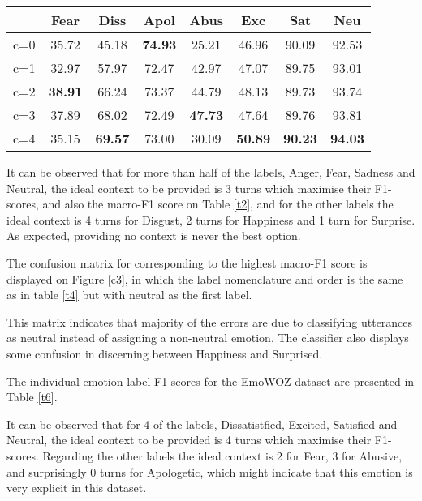 \documentclass[11pt]{article}
\begin{document}
\begin{table*}[t]
 \centering
 \caption{Model performance on each individual emotion label on the \textbf{EmoWOZ} dataset with the introduction of  conversational turns}
  \begin{tabular}{cccccccc}
    \hline
     & \textbf{Fear} & \textbf{Diss} & \textbf{Apol} & \textbf{Abus} & \textbf{Exc} & \textbf{Sat} & \textbf{Neu}  \\
    \hline
    c=0 &35.72           &45.18 & \textbf{74.93}& 25.21& 46.96& 90.09& 92.53  \\
    c=1  &32.97          &57.97 &72.47 &42.97 &47.07 &89.75 & 93.01\\
    c=2 &\textbf{38.91} &66.24 &73.37 &44.79 &48.13 & 89.73&  93.74 \\
    c=3 &37.89 &68.02 & 72.49& \textbf{47.73}& 47.64&89.76 &93.81 \\
    c=4 &35.15 &\textbf{69.57} & 73.00&  30.09& \textbf{50.89}&\textbf{90.23}&\textbf{94.03} \\
    
    \hline
  \end{tabular} 
 \label{t6}
\end{table*}

It can be observed that for more than half of the labels, Anger, Fear, Sadness and Neutral, the ideal context to be provided is 3 turns which maximise their F1-scores, and also the macro-F1 score on Table \ref{t2}, and for the other labels the ideal context is 4 turns for Disgust, 2 turns for Happiness and 1 turn for Surprise. As expected, providing no context is never the best option. 

The confusion matrix for  corresponding to the highest macro-F1 score is displayed on Figure \ref{c3}, in which the label nomenclature and order is the same as in table \ref{t4} but with neutral as the first label. 









This matrix indicates that majority of the errors are due to classifying utterances as neutral instead of assigning a non-neutral emotion. The classifier also displays some confusion in discerning between Happiness and Surprised.

The individual emotion label F1-scores for the EmoWOZ dataset are presented in Table \ref{t6}.


It can be observed that for 4 of the labels, Dissatistfied, Excited, Satisfied and Neutral, the ideal context to be provided is 4 turns which maximise their F1-scores. Regarding the other labels the ideal context is 2 for Fear, 3 for Abusive, and surprisingly 0 turns for Apologetic, which might indicate that this emotion is very explicit in this dataset. 
\end{document}
